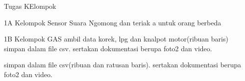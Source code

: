 Tugas KElompok

1A
Kelompok Sensor Suara
Ngomong dan teriak a untuk orang berbeda

1B
Kelompok GAS
ambil data korek, lpg dan knalpot motor(ribuan baris) simpan dalam file csv. sertakan dokumentasi berupa foto2 dan video.





simpan dalam file csv(ribuan dan ratusan baris). sertakan dokumentasi berupa foto2 dan video.